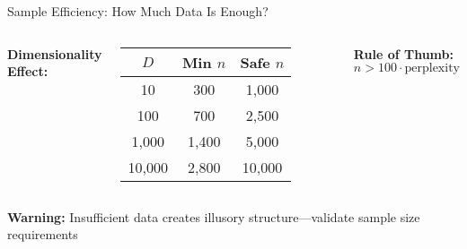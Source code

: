 \documentclass[aspectratio=169]{beamer}
\newcommand{\warning}[1]{\colorbox{red!10}{\textcolor{warningcolor}{\textbf{Warning:} #1}}}
\begin{document}
\begin{frame}{Sample Efficiency: How Much Data Is Enough?}
\begin{columns}

\vspace{0.2cm}
\textbf{Dimensionality Effect:}

\begin{tabular}{c|c|c}
$D$ & Min $n$ & Safe $n$\\
\hline
10 & 300 & 1,000\\
100 & 700 & 2,500\\
1,000 & 1,400 & 5,000\\
10,000 & 2,800 & 10,000
\end{tabular}

\textbf{Rule of Thumb:}
$n > 100 \cdot \text{perplexity}$
  \end{columns}

\vspace{0.3cm}
\warning{Insufficient data creates illusory structure—validate sample size requirements}
\end{frame}
\end{document}
